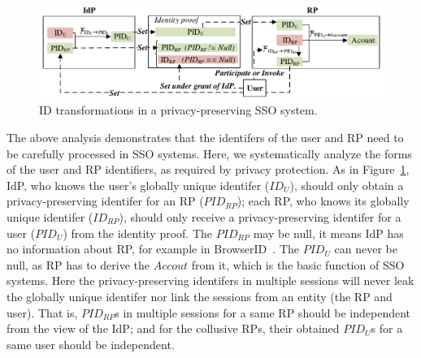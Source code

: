 \begin{figure}
  \centering
  \includegraphics[width=\linewidth]{fig/IDCorrelation.pdf}
  \caption{ID transformations in a privacy-preserving SSO system.}
  \label{fig:IDCorrelation}
\end{figure}

The above analysis demonstrates that the identifers of the user and RP need to be carefully processed in SSO systems.
Here, we systematically analyze the forms of the user and RP identifiers, as required by privacy protection.
As in Figure~\ref{fig:IDCorrelation},
 IdP, who knows the user's globally unique identifer ($ID_U$), should only obtain a privacy-preserving identifer for an RP ($PID_{RP}$);
 each RP, who knows its globally unique identifer ($ID_{RP}$), should only receive a privacy-preserving identifer for a user ($PID_{U}$) from the identity proof.
The $PID_{RP}$ may be null, it means IdP has no information about RP, for example in BrowserID~\cite{BrowserID}.
The $PID_{U}$ can never be null, as RP has to derive the $Accout$ from it, which is the basic function of SSO systems.
Here the  privacy-preserving identifers in multiple sessions will never leak the globally unique identifer nor link the sessions from an entity (the RP and user).
That is, $PID_{RP}$s in multiple sessions for a same RP  should be independent from the view of the IdP;
 and for the collusive RPs, their obtained $PID_{U}$s for a same user should be independent.


